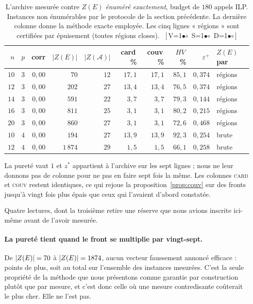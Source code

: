 \documentclass[11pt,a4paper]{article}
\theoremstyle{plain}
\theoremstyle{remark}
\newcommand{\cfgm}[1]{\ifnum#1=1$\bullet$\else$\circ$\fi}
\newcommand{\conf}[3]{%
  \textsf{\footnotesize[\,V\cfgm{#1}\ S\cfgm{#2}\ D\cfgm{#3}\,]}}
\begin{document}
\begin{table}[H]
\centering
\caption{L'archive mesurée contre $Z(E)$ \emph{énuméré exactement}, budget
de $180$ appels ILP. Instances non énumérables par le protocole de la
section précédente. La dernière colonne donne la méthode exacte employée.
Les cinq lignes « régions » sont certifiées par épuisement (toutes régions
closes).\ \conf{1}{1}{1}}
\label{tab:livrableC}
\begin{tabular}{rrrrrrrrrl}
\toprule
$n$ & $p$ & corr & $|Z(E)|$ & $|Z(\mathcal{A})|$ &
card\,\% & couv\,\% & $HV$\,\% & $\varepsilon^+$ & $Z(E)$ par\\
\midrule
$10$ & $3$ & $0{,}00$ & $70$    & $12$ & $17{,}1$ & $17{,}1$ & $85{,}1$ & $0{,}374$ & régions\\
$12$ & $3$ & $0{,}00$ & $202$   & $27$ & $13{,}4$ & $13{,}4$ & $76{,}5$ & $0{,}374$ & régions\\
$14$ & $3$ & $0{,}00$ & $591$   & $22$ & $3{,}7$  & $3{,}7$  & $79{,}3$ & $0{,}144$ & régions\\
$16$ & $3$ & $0{,}00$ & $811$   & $25$ & $3{,}1$  & $3{,}1$  & $80{,}2$ & $0{,}215$ & régions\\
$20$ & $3$ & $0{,}00$ & $860$   & $27$ & $3{,}1$  & $3{,}1$  & $72{,}6$ & $0{,}468$ & régions\\
$10$ & $4$ & $0{,}00$ & $194$   & $27$ & $13{,}9$ & $13{,}9$ & $92{,}3$ & $0{,}254$ & brute\\
$12$ & $4$ & $0{,}00$ & $1\,874$& $29$ & $1{,}5$  & $1{,}5$  & $66{,}1$ & $0{,}258$ & brute\\
\bottomrule
\end{tabular}
\end{table}

\noindent
La pureté vaut $1$ et $z^\ast$ appartient à l'archive sur les sept lignes ;
nous ne leur donnons pas de colonne pour ne pas en faire sept fois la même.
Les colonnes \textsc{card} et \textsc{couv} restent identiques, ce qui
rejoue la proposition~\ref{prop:couv} sur des fronts jusqu'à vingt fois plus
épais que ceux qui l'avaient d'abord constatée.

Quatre lectures, dont la troisième retire une réserve que nous avions
inscrite ici-même avant de l'avoir mesurée.

\paragraph{La pureté tient quand le front se multiplie par vingt-sept.}
De $|Z(E)|=70{}$ à $|Z(E)|=1874{}$, aucun vecteur
faussement annoncé efficace : \puretePtsGrand{} points de plus, soit
\puretePtsTotal{} au total sur l'ensemble des instances mesurées. C'est la
seule propriété de la méthode que nous présentons comme garantie par
construction plutôt que par mesure, et c'est donc celle où une mesure
contredisante coûterait le plus cher. Elle ne l'est pas.
\end{document}
